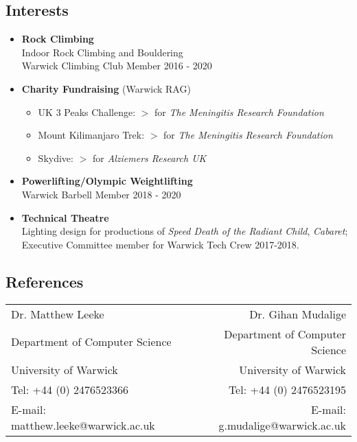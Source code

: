 \documentclass[11pt]{article}
\newcommand{\dash}{\item[-]}
\newcommand{\linesep}{\noindent\makebox[\linewidth]{\rule{\linewidth}{0.2pt}}}
\begin{document}
  \linesep

  \subsection*{Interests}
  \begin{itemize}
\dash \textbf{Rock Climbing} \\ Indoor Rock Climbing and Bouldering \\ Warwick Climbing Club Member 2016 - 2020
\dash \textbf{Charity Fundraising} (Warwick RAG)
   \begin{itemize}[topsep=3pt, itemsep=2pt, partopsep=0pt, parsep=0pt]
    \item[] UK 3 Peaks Challenge: \hfill $>$ for \textit{The Meningitis Research Foundation}
    \item[] Mount Kilimanjaro Trek: \hfill$>$ for \textit{The Meningitis Research Foundation}
    \item[] Skydive: \hfill $>$ for \textit{Alziemers Research UK}
   \end{itemize}
\dash \textbf{Powerlifting/Olympic Weightlifting} \\ \indent Warwick Barbell Member 2018 - 2020 
\dash \textbf{Technical Theatre} \\ \indent Lighting design for productions of \textit{Speed Death of the Radiant
Child}, \textit{Cabaret}; \\ Executive Committee member for Warwick Tech Crew 2017-2018.
  \end{itemize}

  \linesep

\titlespacing*{\subsection}{5pt}{2pt}{3pt}
\renewcommand{\arraystretch}{0.8}

   \vfill

   \subsection*{References}
     \begin{tabularx}{\linewidth}{ l X r }
Dr. Matthew Leeke && Dr. Gihan Mudalige \\
Department of Computer Science && Department of Computer Science \\
University of Warwick && University of Warwick \\
Tel: +44 (0) 2476523366 && Tel: +44 (0) 2476523195 \\
E-mail: matthew.leeke@warwick.ac.uk && E-mail: g.mudalige@warwick.ac.uk 
    \end{tabularx}
\end{document}
